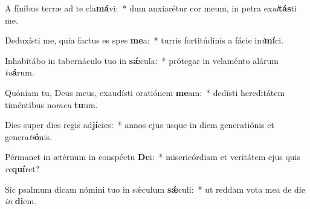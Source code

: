 \item A fínibus terræ ad te cla\textbf{má}vi:~* dum anxiarétur cor meum, in petra ex\textit{al}\textbf{tás}ti me.
\item Deduxísti me, quia factus es spes \textbf{me}a:~* turris fortitúdinis a fácie in\textit{i}\textbf{mí}ci.
\item Inhabitábo in tabernáculo tuo in \textbf{sǽ}cula:~* prótegar in velaménto alárum \textit{tu}\textbf{á}rum.
\item Quóniam tu, Deus meus, exaudísti oratiónem \textbf{me}am:~* dedísti hereditátem timéntibus no\textit{men} \textbf{tu}um.
\item Dies super dies regis ad\textbf{jí}cies:~* annos ejus usque in diem generatiónis et genera\textit{ti}\textbf{ó}nis.
\item Pérmanet in ætérnum in conspéctu \textbf{De}i:~* misericórdiam et veritátem ejus quis \textit{re}\textbf{quí}ret?
\item Sic psalmum dicam nómini tuo in sǽculum \textbf{sǽ}culi:~* ut reddam vota mea de die \textit{in} \textbf{di}em.
